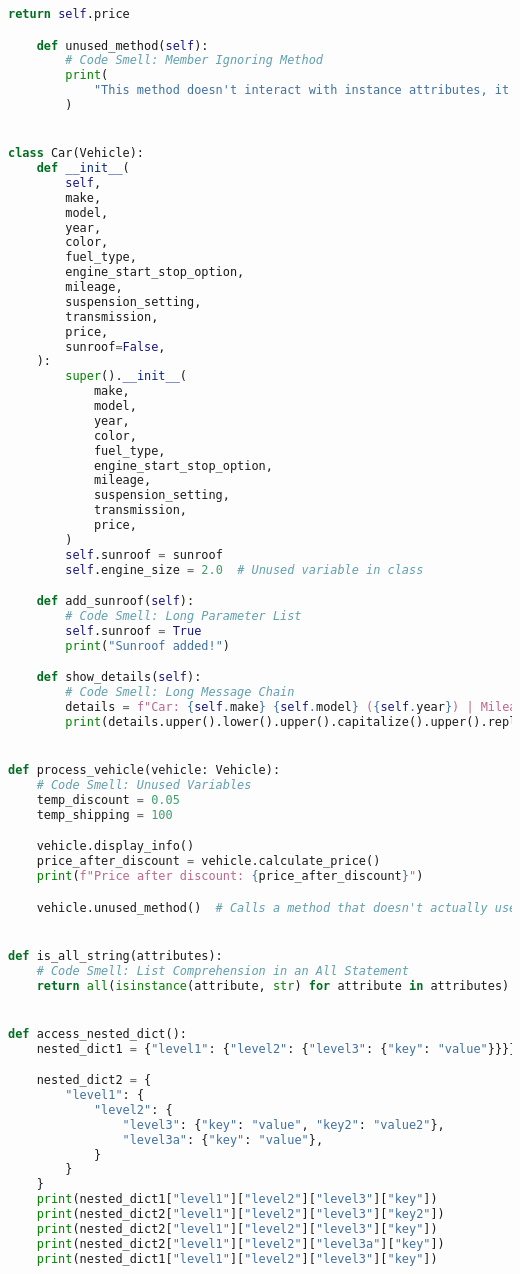 \documentclass{article}
\begin{document}
\begin{lstlisting}[language=Python,caption={Complex Class Structures (sample.py)},label=lst:task7]
        return self.price

    def unused_method(self):
        # Code Smell: Member Ignoring Method
        print(
            "This method doesn't interact with instance attributes, it just prints a statement."
        )


class Car(Vehicle):
    def __init__(
        self,
        make,
        model,
        year,
        color,
        fuel_type,
        engine_start_stop_option,
        mileage,
        suspension_setting,
        transmission,
        price,
        sunroof=False,
    ):
        super().__init__(
            make,
            model,
            year,
            color,
            fuel_type,
            engine_start_stop_option,
            mileage,
            suspension_setting,
            transmission,
            price,
        )
        self.sunroof = sunroof
        self.engine_size = 2.0  # Unused variable in class

    def add_sunroof(self):
        # Code Smell: Long Parameter List
        self.sunroof = True
        print("Sunroof added!")

    def show_details(self):
        # Code Smell: Long Message Chain
        details = f"Car: {self.make} {self.model} ({self.year}) | Mileage: {self.mileage} | Transmission: {self.transmission} | Sunroof: {self.sunroof} | Engine Start Option: {self.engine_start_stop_option} | Suspension Setting: {self.suspension_setting} | Seat Position {self.seat_position_setting}"
        print(details.upper().lower().upper().capitalize().upper().replace("|", "-"))


def process_vehicle(vehicle: Vehicle):
    # Code Smell: Unused Variables
    temp_discount = 0.05
    temp_shipping = 100

    vehicle.display_info()
    price_after_discount = vehicle.calculate_price()
    print(f"Price after discount: {price_after_discount}")

    vehicle.unused_method()  # Calls a method that doesn't actually use the class attributes


def is_all_string(attributes):
    # Code Smell: List Comprehension in an All Statement
    return all(isinstance(attribute, str) for attribute in attributes)


def access_nested_dict():
    nested_dict1 = {"level1": {"level2": {"level3": {"key": "value"}}}}

    nested_dict2 = {
        "level1": {
            "level2": {
                "level3": {"key": "value", "key2": "value2"},
                "level3a": {"key": "value"},
            }
        }
    }
    print(nested_dict1["level1"]["level2"]["level3"]["key"])
    print(nested_dict2["level1"]["level2"]["level3"]["key2"])
    print(nested_dict2["level1"]["level2"]["level3"]["key"])
    print(nested_dict2["level1"]["level2"]["level3a"]["key"])
    print(nested_dict1["level1"]["level2"]["level3"]["key"])



\end{lstlisting}
\end{document}
